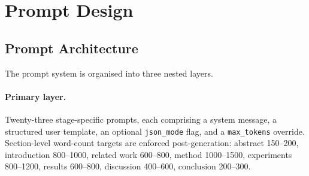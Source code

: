 \documentclass{llmxive}
\begin{document}


\section{Prompt Design}
\label{app:prompts}

\subsection{Prompt Architecture}
\label{app:prompt-arch}

The prompt system is organised into three nested layers.

\paragraph{Primary layer.}
Twenty-three stage-specific prompts, each comprising a system message, a structured user template, an optional \texttt{json\_mode} flag, and a \texttt{max\_tokens} override.
Section-level word-count targets are enforced post-generation: abstract 150--200, introduction 800--1000, related work 600--800, method 1000--1500, experiments 800--1200, results 600--800, discussion 400--600, conclusion 200--300.
\end{document}
